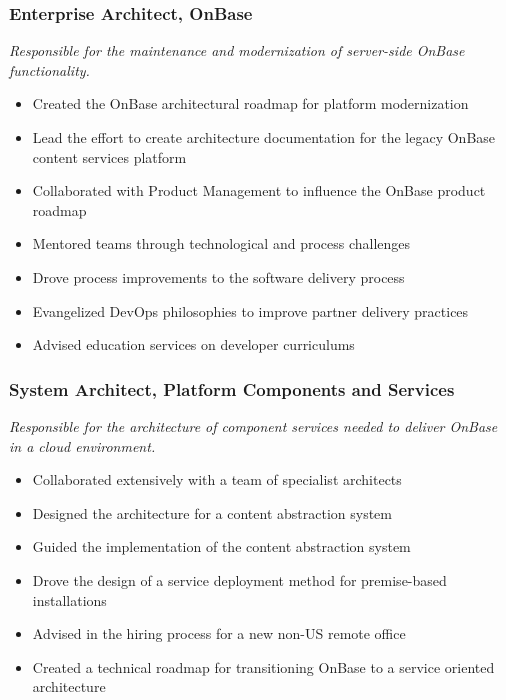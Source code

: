 \documentclass{cv_style}
\begin{document}
			\subsubsection*{Enterprise Architect, OnBase}
			\textit{Responsible for the maintenance and modernization of server-side OnBase functionality.}
			\begin{itemize}
				\item Created the OnBase architectural roadmap for platform modernization
				\item Lead the effort to create architecture documentation for the legacy OnBase content services platform 
				\item Collaborated with Product Management to influence the OnBase product roadmap
				\item Mentored teams through technological and process challenges
				\item Drove process improvements to the software delivery process
				\item Evangelized DevOps philosophies to improve partner delivery practices
				\item Advised education services on developer curriculums
			\end{itemize}

			\subsubsection*{System Architect, Platform Components and Services}
			\textit{Responsible for the architecture of component services needed to deliver OnBase in a cloud environment.} 
			\begin{itemize}
				\item Collaborated extensively with a team of specialist architects
				\item Designed the architecture for a content abstraction system
				\item Guided the implementation of the content abstraction system
				\item Drove the design of a service deployment method for premise-based installations
				\item Advised in the hiring process for a new non-US remote office	
				\item Created a technical roadmap for transitioning OnBase to a service oriented architecture
			\end{itemize}
\end{document}
